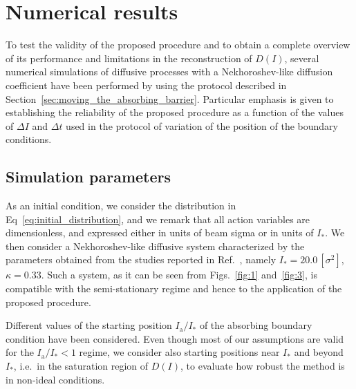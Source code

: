 
\section{Numerical results}
\label{sec:numerical_results}


To test the validity of the proposed procedure and to obtain a complete overview of its performance and limitations in the reconstruction of $D(I)$, several numerical simulations of diffusive processes with a Nekhoroshev-like diffusion coefficient have been performed by using the protocol described in Section~\ref{sec:moving_the_absorbing_barrier}. Particular emphasis is given to establishing the reliability of the proposed procedure as a function of the values of $\Delta I$ and $\Delta t$ used in the protocol of variation of the position of the boundary conditions.


\subsection{Simulation parameters}


As an initial condition, we consider the distribution in Eq~\eqref{eq:initial_distribution}, and we remark that all action variables are {dimensionless, and expressed either in units of beam sigma or in units of $I_\ast$}. We then consider a Nekhoroshev-like diffusive system characterized by the parameters obtained from the studies reported in Ref.~\cite{bazzani2020diffusion}, namely $I_\ast = 20.0\,[\sigma^2]$, $\kappa = 0.33$. Such a system, as it can be seen from Figs.~\ref{fig:1} and~\ref{fig:3}, is compatible with the semi-stationary regime and hence to the application of the proposed procedure.

Different values of the starting position $I_\mathrm{a}/I_\ast$ of the absorbing boundary condition have been considered. Even though most of our assumptions are valid for the $I_\mathrm{a}/I_\ast < 1$ regime, we consider also starting positions near $I_\ast$ and beyond $I_\ast$, i.e.\ in the saturation region of $D(I)$, to evaluate how robust the method is in non-ideal conditions.

